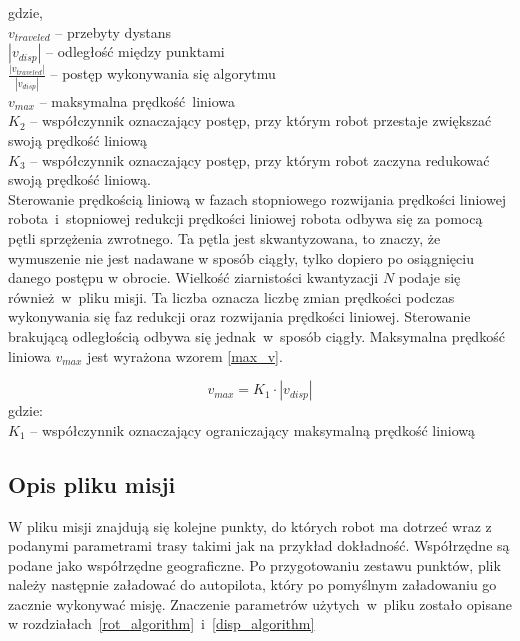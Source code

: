 {{        
        gdzie,\\
        $v_{traveled}$ -- przebyty dystans\\
        $|v_{disp}|$ -- odległość między punktami\\
        $\frac{|v_{traveled}|}{|v_{disp}|}$ -- postęp wykonywania się algorytmu\\
        $v_{max}$ -- maksymalna prędkość liniowa\\
        $K_2$ -- współczynnik oznaczający postęp, przy którym robot przestaje zwiększać swoją prędkość liniową\\
        $K_3$ -- współczynnik oznaczający postęp, przy którym robot zaczyna redukować swoją prędkość liniową.\\

        Sterowanie prędkością liniową w fazach stopniowego rozwijania prędkości liniowej robota~i~stopniowej redukcji prędkości liniowej robota odbywa się za pomocą pętli sprzężenia zwrotnego. Ta pętla jest skwantyzowana, to znaczy, że wymuszenie nie jest nadawane w sposób ciągły, tylko dopiero po osiągnięciu danego postępu w obrocie. Wielkość ziarnistości kwantyzacji $N$ podaje się również~w~pliku misji. Ta liczba oznacza liczbę zmian prędkości podczas wykonywania się faz redukcji oraz rozwijania prędkości liniowej.
        Sterowanie brakującą odległością odbywa się jednak~w~sposób ciągły. Maksymalna prędkość liniowa $v_{max}$ jest wyrażona wzorem \ref{max_v}.
        
        \begin{equation}\label{max_v}
            v_{max}=K_1 \cdot |v_{disp}|
        \end{equation}
        gdzie:\\
        $K_1$ -- współczynnik oznaczający ograniczający maksymalną prędkość liniową\\
    }
    \newpage
    \subsection{Opis pliku misji}
    {
    \label{mission_file}
    W pliku misji znajdują się kolejne punkty, do których robot ma dotrzeć wraz z podanymi parametrami trasy takimi jak na przykład dokładność. Współrzędne są podane jako współrzędne geograficzne. Po przygotowaniu zestawu punktów, plik należy następnie załadować do autopilota, który po pomyślnym załadowaniu go zacznie wykonywać misję. Znaczenie parametrów użytych~w~pliku zostało opisane w rozdziałach~\ref{rot_algorithm}~i~\ref{disp_algorithm}

}}
